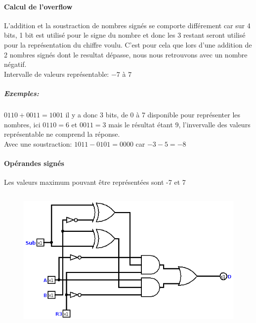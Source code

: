 \documentclass[a4paper]{article}
\begin{document}
\begin{tcolorbox}[colframe=Monokaimagenta,colback=white]

\paragraph{Calcul de l'overflow}
    L'addition et la soustraction de nombres signés se comporte différement car sur 4 bits, 1 bit est utilisé pour le signe du nombre et donc les 3 restant seront utilisé pour la représentation du chiffre voulu. C'est pour cela que lors d'une addition de 2 nombres signés dont le resultat dépasse, nous nous retrouvons avec un nombre négatif.\\
    Intervalle de valeurs représentable: $-7$ à $7$
    \subparagraph{Exemples:} $0110 + 0011 = 1001$ il y a donc 3 bits, de 0 à 7  disponible pour représenter les nombres, ici $0110 = 6$ et $0011 = 3$ mais le résultat étant $9$, l'invervalle des valeurs représentable ne comprend la réponse.\\
    Avec une soustraction: $1011 - 0101  = 0000$ car $-3 - 5 = -8$\\
    
\paragraph{Opérandes signés}
Les valeurs maximum pouvant être représentées sont -7 et 7
    \begin{tabular}{|c|c|c|}
   
    
\end{tabular}        
        

        
\begin{figure}[H]
    \centering
    \includegraphics[width=\textwidth]{src/OVERFADDSUB_4BITS}
    \label{fig:OVERFADDSUB_4BITS}
\end{figure}

\end{tcolorbox}
\end{document}
